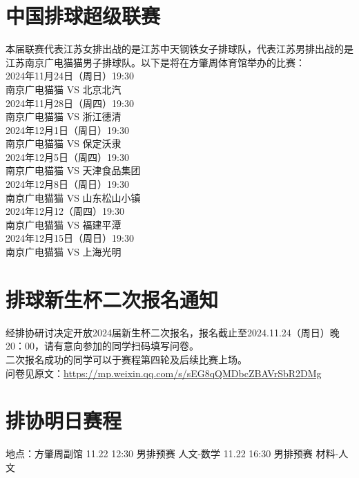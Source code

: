 \documentclass[letterpaper, 12pt]{article}
\begin{document}
\begin{multicols}{2}
\section{中国排球超级联赛}
本届联赛代表江苏女排出战的是江苏中天钢铁女子排球队，代表江苏男排出战的是江苏南京广电猫猫男子排球队。以下是将在方肇周体育馆举办的比赛：\\
2024年11月24日（周日）19:30\\
南京广电猫猫 VS 北京北汽\\
2024年11月28日（周四）19:30\\
南京广电猫猫 VS 浙江德清\\
2024年12月1日（周日）19:30\\
南京广电猫猫 VS 保定沃隶\\
2024年12月5日（周四）19:30\\
南京广电猫猫 VS 天津食品集团\\
2024年12月8日（周日）19:30\\
南京广电猫猫 VS 山东松山小镇\\
2024年12月12（周四）19:30\\
南京广电猫猫 VS 福建平潭\\
2024年12月15日（周日）19:30\\
南京广电猫猫 VS 上海光明\\


\section{排球新生杯二次报名通知}
经排协研讨决定开放2024届新生杯二次报名，报名截止至2024.11.24（周日）晚20：00，请有意向参加的同学扫码填写问卷。\\
二次报名成功的同学可以于赛程第四轮及后续比赛上场。\\
问卷见原文：\url{https://mp.weixin.qq.com/s/sEG8qQMDbcZBAVrSbR2DMg}

\section{排协明日赛程}
地点：方肇周副馆
11.22 12:30 男排预赛 人文-数学
11.22 16:30 男排预赛 材料-人文

\end{multicols} 
\end{document}
